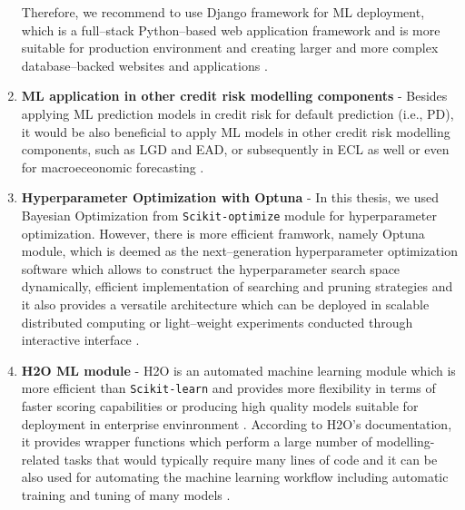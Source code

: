 \begin{enumerate}
    Therefore, we recommend to use Django framework for ML deployment, which is a full--stack Python--based web application framework and is more suitable for production environment and creating larger and more complex database--backed websites and applications \citep{khatri2023}.
    \item \textbf{ML application in other credit risk modelling components} - Besides applying ML prediction models in credit risk for default prediction (i.e., PD), it would be also beneficial to apply ML models in other credit risk modelling components, such as LGD and EAD, or subsequently in ECL as well \citep{munkhdalai2019empirical, grzybowska2020application} or even for macroeceonomic forecasting \citep{hall2018machine}.
    \item \textbf{Hyperparameter Optimization with Optuna} - In this thesis, we used Bayesian Optimization from \lstinline{Scikit-optimize} module for hyperparameter optimization. However, there is more efficient framwork, namely Optuna module, which is deemed as the next--generation hyperparameter optimization software which allows to construct the hyperparameter search space dynamically, efficient implementation of searching and pruning strategies and it also provides
    a versatile architecture which can be deployed in scalable distributed computing or light--weight experiments conducted through interactive interface \citep{akiba2019optuna}.
    \item \textbf{H2O ML module} - H2O is an automated machine learning module which is more efficient than \lstinline{Scikit-learn} and provides more flexibility in terms of faster scoring capabilities or producing high quality models suitable for deployment in enterprise envinronment \citep{ledell2020h2o}. 
    According to H2O's documentation, it provides wrapper functions which perform a large number of modelling-related tasks that would typically require many lines of code and it can be also used for automating the machine learning workflow including automatic training and tuning of many models \citep{H2Oai2023}.
\end{enumerate}